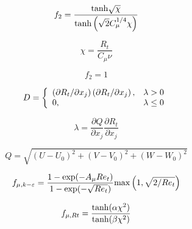 {\newpage\clearpage
{}%
\begin{displaymath}
f_2 = \frac{{\rm tanh}\sqrt{\chi}}{{\rm tanh}\left(\sqrt{2} C_{\mu}^{1/4} \chi\right)}
\end{displaymath}%
\lthtmldisplayZ
\lthtmlcheckvsize\clearpage}

{\newpage\clearpage
{}%
\begin{displaymath}
\chi = \frac{R_t}{C_{\mu} \nu}
\end{displaymath}%
\lthtmldisplayZ
\lthtmlcheckvsize\clearpage}

{\newpage\clearpage
{}%
\begin{displaymath}
f_2 = 1
\end{displaymath}%
\lthtmldisplayZ
\lthtmlcheckvsize\clearpage}

{\newpage\clearpage
{}%
\begin{displaymath}
  D = \left\{
  \begin{array}{l l}
  \left(\partial R_t / \partial x_j\right)
  \left(\partial R_t / \partial x_j\right), & \lambda>0 \\
  0, & \lambda \leq 0
  \end{array}\right.
\end{displaymath}%
\lthtmldisplayZ
\lthtmlcheckvsize\clearpage}

{\newpage\clearpage
{}%
\begin{displaymath}
\lambda = \frac{\partial Q}{\partial x_j} \frac{\partial R_t}{\partial x_j}
\end{displaymath}%
\lthtmldisplayZ
\lthtmlcheckvsize\clearpage}

{\newpage\clearpage
{}%
\begin{displaymath}
Q = \sqrt{(U-U_0)^2 + (V-V_0)^2 + (W-W_0)^2}
\end{displaymath}%
\lthtmldisplayZ
\lthtmlcheckvsize\clearpage}

{\newpage\clearpage
{}%
\begin{displaymath}
f_{\mu,k-\varepsilon} = \frac{1-{\rm exp}(-A_{\mu}Re_t)}{1-{\rm exp}(-\sqrt{Re_t})}
{\rm max}\left( 1, \sqrt{2/Re_t} \right)
\end{displaymath}%
\lthtmldisplayZ
\lthtmlcheckvsize\clearpage}

{\newpage\clearpage
{}%
\begin{displaymath}
f_{\mu,Rt} = \frac{{\rm tanh}(\alpha \chi^2)}
{{\rm tanh}(\beta \chi^2)}
\end{displaymath}%
\lthtmldisplayZ
\lthtmlcheckvsize\clearpage}

